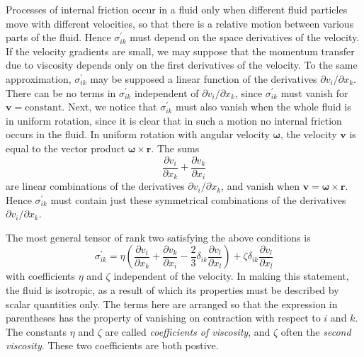 \documentclass[conference]{IEEEtran}
\theoremstyle{definition}
\theoremstyle{remark}
\begin{document}
    Processes of internal friction occur in a fluid only when different fluid particles move with different velocities, so that there is a relative motion between various parts of the fluid. Hence $\sigma^\prime_{ik}$ must depend on the space derivatives of the velocity. If the velocity gradients are small, we may suppose that the momentum transfer due to viscosity depends only on the first derivatives of the velocity. To the same approximation, $\sigma^\prime_{ik}$ may be supposed a linear function of the derivatives $\partial v_i / \partial x_k$. There can be no terms in $\sigma^\prime_{ik}$ independent of $\partial v_i / \partial x_k$, since $\sigma^\prime_{ik}$ must vanish for $\mathbf{v} = \text{constant}$. Next, we notice that $\sigma^\prime_{ik}$ must also vanish when the whole fluid is in uniform rotation, since it is clear that in such a motion no internal friction occurs in the fluid. In uniform rotation with angular velocity $\boldsymbol{\omega}$, the velocity $\mathbf{v}$ is equal to the vector product $\boldsymbol{\omega} \times \mathbf{r}$. The sums
    \[
        \dfrac{\partial v_i}{\partial x_k} + \dfrac{\partial v_k}{\partial x_i}
    \]
    are linear combinations of the derivatives $\partial {v_i} / \partial x_k$, and vanish when $\mathbf{v} = \boldsymbol{\omega} \times \mathbf{r}$. Hence $\sigma^\prime_{ik}$ must contain just these symmetrical combinations of the derivatives $\partial v_i / \partial x_k$.

    The most general tensor of rank two satisfying the above conditions is 
    \begin{equation}
        \sigma^\prime_{ik} = \eta \left( \dfrac{\partial v_i}{\partial x_k} + \dfrac{\partial v_k}{\partial x_i} - \dfrac23 \delta_{ik} \dfrac{\partial v_l}{\partial x_l} \right) + \zeta \delta_{ik} \dfrac{\partial v_l}{\partial x_l}
    \end{equation}
    with coefficients $\eta$ and $\zeta$ independent of the velocity. In making this statement, the fluid is isotropic, as a result of which its properties must be described by scalar quantities only. The terms here are arranged so that the expression in parentheses has the property of vanishing on contraction with respect to $i$ and $k$. The constants $\eta$ and $\zeta$ are called \emph{coefficients of viscosity}, and $\zeta$ often the \emph{second viscosity}. These two coefficients are both postive.
\end{document}

